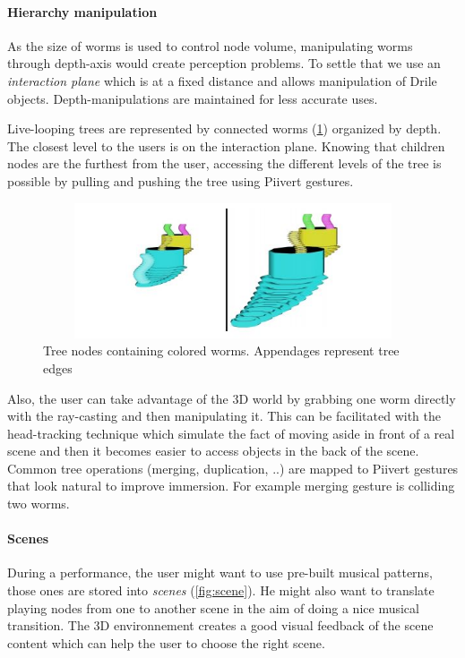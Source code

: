 \paragraph{Hierarchy manipulation}  
As the size of worms is used to control node volume, manipulating worms through depth-axis would create perception problems. To settle that we use an \textit{interaction plane} which is at a fixed distance and allows manipulation of Drile objects. Depth-manipulations are maintained for less accurate uses.

Live-looping trees are represented by connected worms (\ref{fig:worm}) organized by depth. The closest level to the users is on the interaction plane.
Knowing that children nodes are the furthest from the user, accessing the different levels of the tree is possible by pulling and pushing the tree using Piivert gestures. 

\begin{figure}[h!]
\centering\includegraphics[width=14cm,height=4cm]{image/worm.jpg}
\caption{Tree nodes containing colored worms. Appendages represent tree edges}
\label{fig:worm}
\end{figure} 

 Also, the user can take advantage of the 3D world by grabbing one worm directly with the ray-casting and then manipulating it. This can be facilitated with the head-tracking technique which simulate the fact of moving aside in front of a real scene and then it becomes easier to access objects in the back of the scene. 
 Common tree operations (merging, duplication, ..) are mapped to Piivert gestures that look natural to improve immersion. For example merging gesture is colliding two worms.

\paragraph{Scenes}  

During a performance, the user might want to use pre-built musical patterns, those ones are stored into \textit{scenes} (\ref{fig:scene}). He might also want to translate playing nodes from one to another scene in the aim of doing a nice musical transition. The 3D environnement creates a good visual feedback of the scene content which can help the user to choose the right scene.

